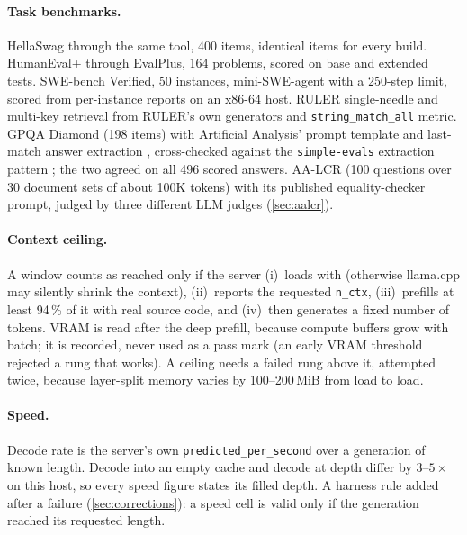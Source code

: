 \paragraph{Task benchmarks.} HellaSwag through the same tool, 400 items, identical items for every
build. HumanEval+ through EvalPlus, 164 problems, scored on base and extended tests. SWE-bench
Verified, 50 instances, mini-SWE-agent with a 250-step limit, scored from per-instance reports on an
x86-64 host. RULER single-needle and multi-key retrieval from RULER's own generators and
\texttt{string\_match\_all} metric. GPQA Diamond (198 items) with Artificial Analysis' prompt template
and last-match answer extraction \citep{artificialanalysis2026methodology}, cross-checked against the
\texttt{simple-evals} extraction pattern \citep{openai_simpleevals}; the two agreed on all 496 scored
answers. AA-LCR (100 questions over 30 document sets of about 100K tokens) with its published
equality-checker prompt, judged by three different LLM judges (\cref{sec:aalcr}).

\paragraph{Context ceiling.} A window counts as reached only if the server (i)~loads with
 (otherwise llama.cpp may silently shrink the context), (ii)~reports the requested
\texttt{n\_ctx}, (iii)~prefills at least 94\,\% of it with real source code, and (iv)~then generates a
fixed number of tokens. VRAM is read after the deep prefill, because compute buffers grow with batch;
it is recorded, never used as a pass mark (an early VRAM threshold rejected a rung that works). A
ceiling needs a failed rung above it, attempted twice, because layer-split memory varies by
100--200\,MiB from load to load.

\paragraph{Speed.} Decode rate is the server's own \texttt{predicted\_per\_second} over a generation of
known length. Decode into an empty cache and decode at depth differ by $3$--$5\times$ on this host, so
every speed figure states its filled depth. A harness rule added after a failure
(\cref{sec:corrections}): a speed cell is valid only if the generation reached its requested length.

